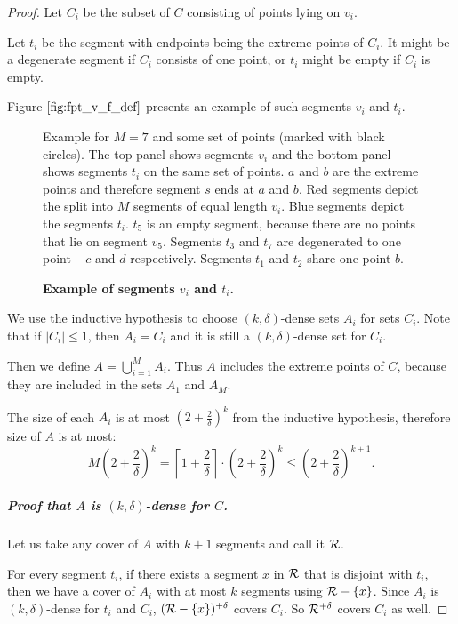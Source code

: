 \begin{proof}
Let $C_i$ be the subset of $C$ consisting of points lying on $v_i$.

Let $t_i$ be the segment with endpoints being the extreme points of $C_i$.
It might be a degenerate segment if $C_i$ consists of one point,
or $t_i$ might be empty if $C_i$ is empty.

Figure $\ref{fig:fpt_v_f_def}$ presents an example
of such segments $v_i$ and $t_i$.

\begin{figure}[h]
\begin{center}
\def\svgwidth{\columnwidth}

\end{center}
\caption{\textbf{Example of segments $v_i$ and $t_i$.}}
Example for $M = 7$ and some set of points (marked with black circles).
The top panel shows segments $v_i$ and the bottom panel shows segments $t_i$
on the same set of points.
$a$ and $b$ are the extreme points and therefore segment $s$
ends at $a$ and $b$.
Red segments depict the split into $M$ segments of equal length $v_i$.
Blue segments depict the segments $t_i$. $t_5$ is an empty segment,
because there are no points that lie on segment $v_5$.
Segments $t_3$ and $t_7$ are degenerated to one point --
$c$ and $d$ respectively.
Segments $t_1$ and $t_2$ share one point $b$.
\label{fig:fpt_v_f_def}
\end{figure}

We use the inductive hypothesis to choose $(k, \delta)$-dense sets $A_i$
for sets $C_i$. Note that if $|C_i| \le 1$, then $A_i = C_i$
and it is still a $(k, \delta)$-dense set for $C_i$.

Then we define $A = \bigcup_{i=1}^{M} A_i$.
Thus $A$ includes the extreme points of $C$,
because they are included in the sets $A_1$ and $A_M$.

The size of each $A_i$ is at most $(2+\frac{2}{\delta})^{k}$
from the inductive hypothesis, therefore size of $A$ is at most:
$$M\left(2+\frac{2}{\delta}\right)^{k} =
\left\lceil1+\frac{2}{\delta}\right\rceil\cdot\left(2+\frac{2}{\delta}\right)^{k}
\le \left(2+\frac{2}{\delta}\right)^{k+1}.$$


\subparagraph{Proof that $A$ is $(k, \delta)$-dense for $C$.}
Let us take any cover of $A$ with $k+1$ segments and call it $\mathcal{R}$.

For every segment $t_i$, if there exists a segment $x$ in $\mathcal{R}$ 
that is disjoint with $t_i$,
then we have a cover of $A_i$ with at most $k$
segments using $\mathcal{R} - \{x\}$.
Since $A_i$ is $(k, \delta)$-dense for $t_i$ and $C_i$,
$(\mathcal{R} - \{x\})^{+\delta}$ covers $C_i$.
So $\mathcal{R}^{+\delta}$ covers $C_i$ as well.


\end{proof}
